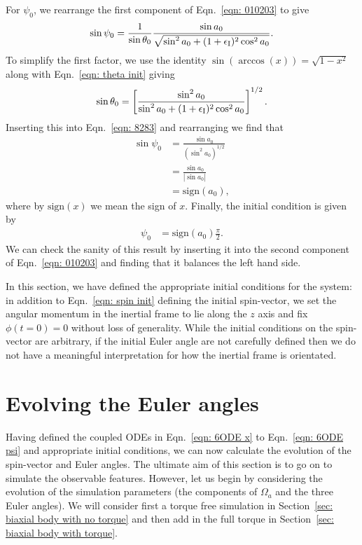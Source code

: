 \documentclass[../full_thesis/full_thesis.tex]{subfiles}
\begin{document}
For $\psi_0$, we rearrange the first component of Eqn.~\eqref{eqn: 010203} to
give
\begin{equation}
\sin\psi_{0} =\frac{1}{ \sin\theta_{0}}
\frac{\sin a_{0}}{\sqrt{\sin^2 a_{0} + (1+\epsilon_{\mathrm{I}})^2 \cos^2 a_{0}}}.
\label{eqn: 8283}
\end{equation}
To simplify the first factor, we use the identity $\sin(\arccos(x)) = \sqrt{1 - x^{2}}$
along with Eqn.~\eqref{eqn:  theta init} giving
\begin{equation}
\sin\theta_{0} = \left[\frac{\sin^2 a_{0}}
{\sin^2 a_{0} + (1+\epsilon_{\mathrm{I}})^2 \cos^2 a_{0}} \right]^{1/2}.
\end{equation}
Inserting this into Eqn.~\eqref{eqn: 8283} and rearranging we find that
\begin{align}
\sin \psi_0 & = \frac{\sin a_{0}}{\left(\sin^{2} a_{0}\right)^{1/2}} \\
 & = \frac{\sin a_{0} }{|\sin a_{0}|} \\
& = \mathrm{sign}(a_{0}),
\end{align}
where by $\mathrm{sign}(x)$ we mean the sign of $x$. Finally, the initial
condition is given by
\begin{align}
\psi_{0} & =\mathrm{sign}(a_{0}) \frac{\pi}{2}.
\label{eqn: psi  init}
\end{align}
We can check the sanity of this result by inserting it into the second component of
Eqn.~\eqref{eqn: 010203} and finding that it balances the left hand side.

In this section, we have defined the appropriate initial conditions for the
system: in addition to Eqn.~\eqref{eqn: spin init} defining the initial spin-vector,
we set the angular momentum in the inertial frame to lie along the
$z$ axis and fix $\phi(t=0)=0$ without loss of generality.  While the
initial conditions on the spin-vector are arbitrary, if the initial Euler angle
are not carefully defined then we do not have a meaningful interpretation for
how the inertial frame is orientated.

\section{Evolving the Euler angles}
\label{sec: evolving the euler angles}

Having defined the coupled ODEs in Eqn.~\eqref{eqn: 6ODE x} to Eqn.~\eqref{eqn:
6ODE psi} and appropriate initial conditions, we can now calculate the evolution
of the spin-vector and Euler angles. The ultimate aim of this section is to go
on to simulate the observable features. However, let us begin by considering the
evolution of the simulation parameters (the components of
$\Omega_a$ and the three Euler angles). We will consider first a torque free
simulation in Section~\ref{sec: biaxial body with no torque} and then add in
the full torque in Section~\ref{sec: biaxial body with torque}.
\end{document}
